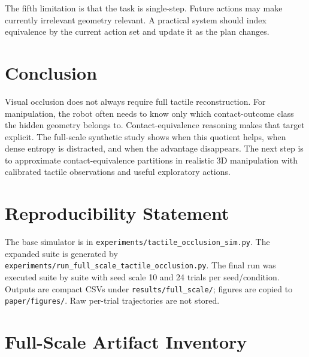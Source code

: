 \documentclass{article}
\begin{document}
The fifth limitation is that the task is single-step. Future actions may make currently irrelevant geometry relevant. A practical system should index equivalence by the current action set and update it as the plan changes.

\section{Conclusion}

Visual occlusion does not always require full tactile reconstruction. For manipulation, the robot often needs to know only which contact-outcome class the hidden geometry belongs to. Contact-equivalence reasoning makes that target explicit. The full-scale synthetic study shows when this quotient helps, when dense entropy is distracted, and when the advantage disappears. The next step is to approximate contact-equivalence partitions in realistic 3D manipulation with calibrated tactile observations and useful exploratory actions.

\section*{Reproducibility Statement}

The base simulator is in \texttt{experiments/tactile\_occlusion\_sim.py}. The expanded suite is generated by \texttt{experiments/run\_full\_scale\_tactile\_occlusion.py}. The final run was executed suite by suite with seed scale 10 and 24 trials per seed/condition. Outputs are compact CSVs under \texttt{results/full\_scale/}; figures are copied to \texttt{paper/figures/}. Raw per-trial trajectories are not stored.




\appendix

\section{Full-Scale Artifact Inventory}
\end{document}
